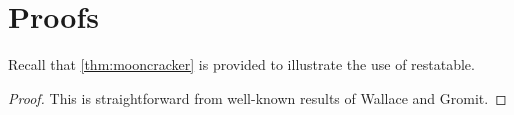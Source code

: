 \documentclass{article}
\begin{document}
\newpage
\appendix


\section{Proofs}
Recall that \cref{thm:mooncracker} is provided to illustrate the use of restatable.
\mooncracker* 
\begin{proof}
  This is straightforward from well-known results of Wallace and Gromit. 
\end{proof}
\end{document}
